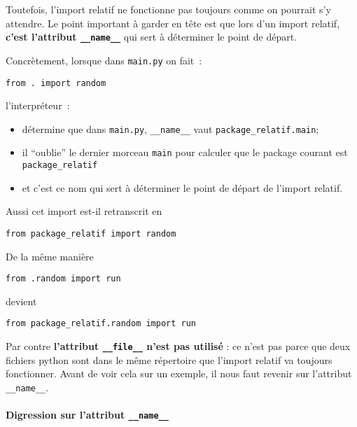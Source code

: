     Toutefois, l'import relatif ne fonctionne pas toujours comme on pourrait
s'y attendre. Le point important à garder en tête est que lors d'un
import relatif, \textbf{c'est l'attribut \texttt{\_\_name\_\_}} qui sert
à déterminer le point de départ.

    Concrètement, lorsque dans \texttt{main.py} on fait~:

\begin{verbatim}
from . import random
\end{verbatim}

l'interpréteur~:

\begin{itemize}
\tightlist
\item
  détermine que dans \texttt{main.py}, \texttt{\_\_name\_\_} vaut
  \texttt{package\_relatif.main};
\item
  il ``oublie'' le dernier morceau \texttt{main} pour calculer que le
  package courant est \texttt{package\_relatif}
\item
  et c'est ce nom qui sert à déterminer le point de départ de l'import
  relatif.
\end{itemize}

Aussi cet import est-il retranscrit en

\begin{verbatim}
from package_relatif import random
\end{verbatim}

    De la même manière

\begin{verbatim}
from .random import run
\end{verbatim}

devient

\begin{verbatim}
from package_relatif.random import run
\end{verbatim}

    Par contre \textbf{l'attribut \texttt{\_\_file\_\_} n'est pas utilisé} :
ce n'est pas parce que deux fichiers python sont dans le même répertoire
que l'import relatif va toujours fonctionner. Avant de voir cela sur un
exemple, il nous faut revenir sur l'attribut \texttt{\_\_name\_\_}.

    \hypertarget{digression-sur-lattribut-__name__}{%
\paragraph{\texorpdfstring{Digression sur l'attribut
\texttt{\_\_name\_\_}}{Digression sur l'attribut \_\_name\_\_}}\label{digression-sur-lattribut-__name__}}

